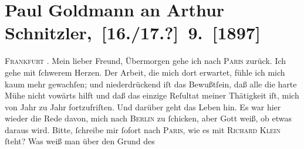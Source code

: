 

         
         \renewcommand{\erwaehntePersonen}{Personen: Berthold Frischauer, Richard Klein, Arthur Klein, Johann Klein}
         \renewcommand{\erwaehnteOrte}{Orte: Berlin, Frankfurt am Main, Paris, Wien}
         \renewcommand{\erwaehnteWerke}{}
               \section[ Paul Goldmann an Arthur Schnitzler, {[}16./17.?{]} 9. {[}1897{]}]{ Paul Goldmann an Arthur Schnitzler, {[}16./17.?{]} 9. {[}1897{]}}\nopagebreak{}\rehead{ }\begin{ledgroupsized}[t]{13cm}\normalsize\beginnumbering \toendnotes[C]{\smallbreak\pagebreak[2]} 
\toendnotes[C]{\smallbreak}\pstart
           \raggedleft{}{\pb}\textsc{Frankfurt}{ }\label{K_L02824-1v}\label{K_L02824-1h}.\pend
           \pstart\center{}Mein lieber Freund,\pend\pstart
           Übermorgen gehe ich nach \textsc{Paris} zurück. Ich gehe mit ſchwerem Herzen. Der Arbeit, die mich dort erwartet, fühle
               ich mich kaum mehr gewachſen; und niederdrückend iſt das Bewußtſein, daß alle die
               harte Mühe nicht vowärts hilft und daß das einzige Reſultat meiner Thätigkeit iſt,
               mich von Jahr zu Jahr fortzufriſten. Und darüber geht das Leben  hin. Es war hier wieder die Rede davon, mich nach
                  \textsc{Berlin} zu ſchicken, aber Gott weiß, ob etwas daraus wird.\pend
           \pstart
           Bitte, ſchreibe mir ſofort nach \textsc{Paris}, wie es mit \textsc{Richard Klein} ſteht? Was weiß man {\pb}über den Grund des

\end{ledgroupsized}
